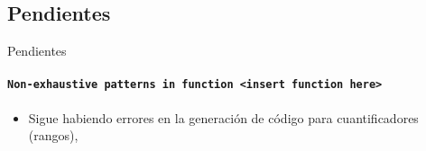 \subsection{Pendientes}
\begin{frame}{Pendientes}
\framesubtitle{\texttt{Non-exhaustive patterns in function <insert function here>}}
\begin{itemize}
  \item Sigue habiendo errores en la generación de código para cuantificadores (rangos),
\end{itemize}
\end{frame}